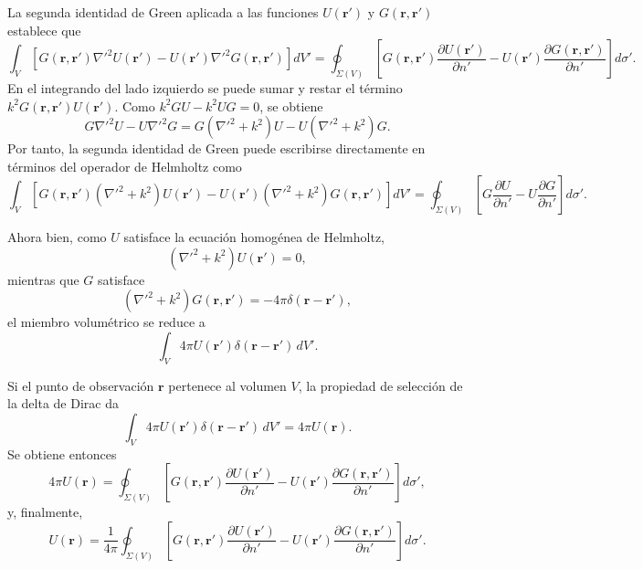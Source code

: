 \documentclass[12pt,a4paper]{article}
\numberwithin{equation}{section}
\begin{document}
La segunda identidad de Green aplicada a las funciones \(U(\mathbf r')\) y \(G(\mathbf r,\mathbf r')\) establece que
\begin{equation}
\int_V
\left[
G(\mathbf r,\mathbf r')\nabla'^2 U(\mathbf r')
-
U(\mathbf r')\nabla'^2 G(\mathbf r,\mathbf r')
\right]dV'
=
\oint_{\Sigma(V)}
\left[
G(\mathbf r,\mathbf r')
\frac{\partial U(\mathbf r')}{\partial n'}
-
U(\mathbf r')
\frac{\partial G(\mathbf r,\mathbf r')}{\partial n'}
\right]
d\sigma'.
\label{eq:second_Green_identity}
\end{equation}
En el integrando del lado izquierdo se puede sumar y restar el término \(k^2G(\mathbf r,\mathbf r')U(\mathbf r')\). Como \(k^2G U-k^2U G=0\), se obtiene
\begin{equation}
G\nabla'^2U-U\nabla'^2G
=
G(\nabla'^2+k^2)U
-
U(\nabla'^2+k^2)G.
\label{eq:Green_identity_Helmholtz_operator}
\end{equation}
Por tanto, la segunda identidad de Green puede escribirse directamente en términos del operador de Helmholtz como
\begin{equation}
\int_V
\left[
G(\mathbf r,\mathbf r')
(\nabla'^2+k^2)U(\mathbf r')
-
U(\mathbf r')
(\nabla'^2+k^2)G(\mathbf r,\mathbf r')
\right]dV'
=
\oint_{\Sigma(V)}
\left[
G\frac{\partial U}{\partial n'}
-
U\frac{\partial G}{\partial n'}
\right]
d\sigma'.
\label{eq:second_Green_identity_Helmholtz_operator}
\end{equation}

Ahora bien, como \(U\) satisface la ecuación homogénea de Helmholtz,
\begin{equation}
(\nabla'^2+k^2)U(\mathbf r')=0,
\end{equation}
mientras que \(G\) satisface
\begin{equation}
(\nabla'^2+k^2)G(\mathbf r,\mathbf r')
=
-4\pi\delta(\mathbf r-\mathbf r'),
\end{equation}
el miembro volumétrico se reduce a
\begin{equation}
\int_V
4\pi U(\mathbf r')\delta(\mathbf r-\mathbf r')\,dV'.
\end{equation}

Si el punto de observación \(\mathbf r\) pertenece al volumen \(V\), la propiedad de selección de la delta de Dirac da
\begin{equation}
\int_V
4\pi U(\mathbf r')\delta(\mathbf r-\mathbf r')\,dV'
=
4\pi U(\mathbf r).
\end{equation}
Se obtiene entonces
\begin{equation}
4\pi U(\mathbf r)
=
\oint_{\Sigma(V)}
\left[
G(\mathbf r,\mathbf r')
\frac{\partial U(\mathbf r')}{\partial n'}
-
U(\mathbf r')
\frac{\partial G(\mathbf r,\mathbf r')}{\partial n'}
\right]
d\sigma',
\end{equation}
y, finalmente,
\begin{equation}
U(\mathbf r)
=
\frac{1}{4\pi}
\oint_{\Sigma(V)}
\left[
G(\mathbf r,\mathbf r')
\frac{\partial U(\mathbf r')}{\partial n'}
-
U(\mathbf r')
\frac{\partial G(\mathbf r,\mathbf r')}{\partial n'}
\right]
d\sigma'.
\label{eq:Green_integral_theorem}
\end{equation}
\end{document}
